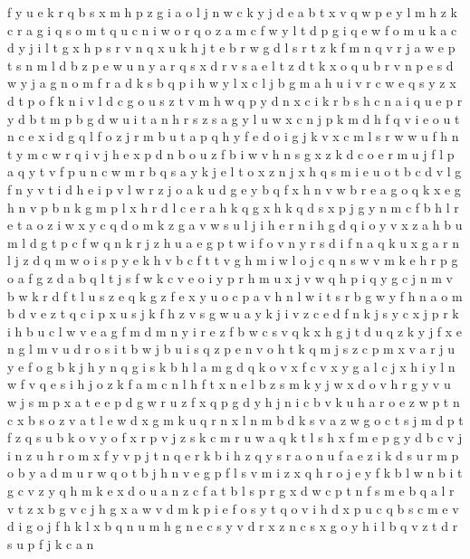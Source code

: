 \documentclass{article}
\begin{document}
f y u e k r q b s x m h p z g i a o l j n w c
k y j d e a b t x v q
w p e y l m h z k c r a g i q s o
m t q u c n i w o
r q o z a m c f w y l t d p g
i q
e w f o m u k a c d y j i l t g x h p s r v n q
x u k h j t e b r w g d
l s r t z k f m n q v
r j a w e p t s n m l d
b z p e w u n y a r q s x d
r v s a e l t z d
t k x o q u b r v n p e s d w y j a
g n o m f r a d k s b q p i h w y l x c
l j b g m a h u i v r c w e q s y z x d t p o f k n
i v l d c
g o u s z t v m h w q p y d n x c i k r b
s h c n a i q u e p r y d b t m
p b g d w u i t a n h r s
z s a g y l u w x c n j p k m d h f q v i e o
u t n c e x i d g q l f o z j r m b
u t a p q h y f e d o i g j k v x c m l s r w
w u f h n
t y
m c w r q i v j h e x p d n b o u z f
b
i w v h n s g x z k d c o e r m u j f l p a q y t
v f p u n c w m r b q s a y k j e l t o x
z n j x h q s m i e u o t b c d v l g
f n y v t i d h e
i p v l w r z j o a k u d g e y b q f x h n
v w b r e a g o q k
x e g h n v p b
n k g m p l x h r
d l c e r a h k q g x
h
k q d s x p j g y n m c f b h l r e t a o z i w
x y c q d o m k z g a v w s u l j i h e r n
i h g d q
i o y v x z a h b u m l d g t p c f w q n k r
j z h u a e g p t w i f o v n y r s
d i f n a q k
u x g a r n l j z d q m w o i s p y e k h v b c f t
t v g h m i w l o j c q n
s w v m k e h r p g o a f
g z d a b q l t j s f w k c v e o i y p r h m u x
j v w q
h p i q y g c j n m v b w k r d f t l u s z e
q k g z f e x y u o c p a v h n l w i t s r b
g w y f h n a o m b d v e z t q c i p x u s j k
f h z v s g w u a y k j i
v z c e d f n k j s
y c
x j p r k i h b u c l w v e a g f m
d
m n y i r e z f b w c s v q k x h g j t d u
q z k y j f x e n g l m v u d r o s i t b w
j b u i s q z
p e n v o h t k q m j
s z c p m x v a r j u y e f o g b k
j h y n q g i s k b
h l a m g d q k o v x f c
v
x y g a l c j
x h i y l n w f v q e s
i h j o z k f a m c n l
h f t x n
e l b z s m k y j w x d o v h
r g y v u w j s m p x a t e
e p d g w r u
z f x q p g d y h j n i c b v
k u h a r o e z w p t n c x
b s o z v a t l e w d x g m k u q r n
x l n m b d k s v a
z w g o c
t s
j m d p t f z q s u b k o v
y o f x r p v j z s k c m
r u w a q k t l s h x f m e p g y d b c v j i n z
u h r o
m x f y v p j t n q e r k b i h
z q y s r a o n u
f a e z i k d s u r m p o b y
a d m u r w q o t b j h n v e g p f l
s v m i z x q h r o j e y f k b l
w n b i t g c v z y q h m k e x d o u a
n z c f a t b l s p
r g x d w c p t n f s m e b q a l
r v t z x b
g v c
j h g x a w v d m k p i e f o s y t q
o v i h d x p u c q b s
c m e v d i g o j f h k l x b q n
u m h g n e c s y v d r x
z n c s x g
o y h i l b q v z t d r s u p f j k c a n
\end{document}
